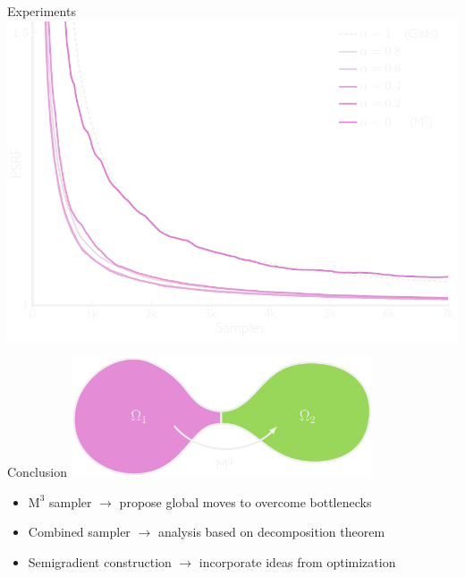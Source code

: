 \documentclass[mathserif]{beamer}
\begin{document}
\begin{frame}{Experiments}
\vspace{1em}
\centering
\includegraphics[width=\textwidth,trim=0 0 0 0,clip]{figures/exp3.pdf}
\end{frame}


\begin{frame}{Conclusion}
\vspace{1em}
\centering
\includegraphics[width=3.5in]{figures/bottleneck_conclusion.pdf}

\vspace{1.5em}
\begin{itemize}
  \item<1-> $\mathrm{M}^3$ sampler $\rightarrow$ propose global moves to overcome bottlenecks
  \vspace{1em}
  \item<2-> Combined sampler $\rightarrow$ analysis based on decomposition theorem
  \vspace{1em}
  \item<3-> Semigradient construction $\rightarrow$ incorporate ideas from optimization
\end{itemize}

\end{frame}
\end{document}

